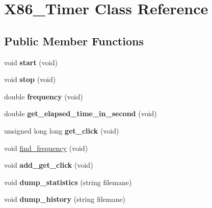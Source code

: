 \hypertarget{class_x86___timer}{}\section{X86\+\_\+\+Timer Class Reference}
\label{class_x86___timer}
\subsection*{Public Member Functions}
\begin{DoxyCompactItemize}
\item 
\mbox{\label{class_x86___timer_a90050edc326c78c5e1322a17d2602af9}} 
void {\bfseries start} (void)
\item 
\mbox{\label{class_x86___timer_ab1b153b8e942f23d6ff809ed30d348cc}} 
void {\bfseries stop} (void)
\item 
\mbox{\label{class_x86___timer_ab46d07feea13b7846a4b1f5a92dbf1f7}} 
double {\bfseries frequency} (void)
\item 
\mbox{\label{class_x86___timer_a69dd9817f6f3e2cc165d981bc778ce33}} 
double {\bfseries get\+\_\+elapsed\+\_\+time\+\_\+in\+\_\+second} (void)
\item 
\mbox{\label{class_x86___timer_a3f6ad78024b1403e4ce0a6dec2164963}} 
unsigned long long {\bfseries get\+\_\+click} (void)
\item 
void \hyperlink{class_x86___timer_a1beddd8cb10ed89d3dd06d3b233b63e1}{find\+\_\+frequency} (void)
\item 
\mbox{\label{class_x86___timer_a3863c016a3154c33caaadf7886e53079}} 
void {\bfseries add\+\_\+get\+\_\+click} (void)
\item 
\mbox{\label{class_x86___timer_a6c602580635e29c5dca9a67272901193}} 
void {\bfseries dump\+\_\+statistics} (string filemane)
\item 
\mbox{\label{class_x86___timer_a284acddc2cc02912231a29632457313a}} 
void {\bfseries dump\+\_\+history} (string filemane)
\item 
\mbox{\label{class_x86___timer_af538c36f392114bd1e6030280302a1ff}} 

\end{DoxyCompactItemize}
